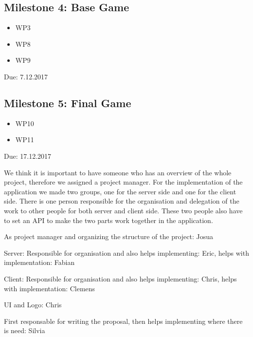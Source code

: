 \documentclass{report}
\begin{document}
\subsection{Milestone 4: Base Game}
\begin{itemize}
	\item WP3
	\item WP8
	\item WP9
\end{itemize}
Due: 7.12.2017

\subsection{Milestone 5: Final Game}
\begin{itemize}
	\item WP10
	\item WP11
\end{itemize}
Due: 17.12.2017

We think it is important to have someone who has an overview of the whole project, therefore we assigned a project manager. For the implementation of the application we made two groups, one for the server side and one for the client side. There is one person responsible for the organisation and delegation of the work to other people for both server and client side. These two people also have to set an API to make the two parts work together in the application.

As project manager and organizing the structure of the project: Josua

Server: Responsible for organisation and also helps implementing: Eric, helps with implementation: Fabian

Client: Responsible for organisation and also helps implementing: Chris, helps with implementation: Clemens

UI and Logo: Chris

First responsable for writing the proposal, then helps implementing where there is need: Silvia




\end{document}
